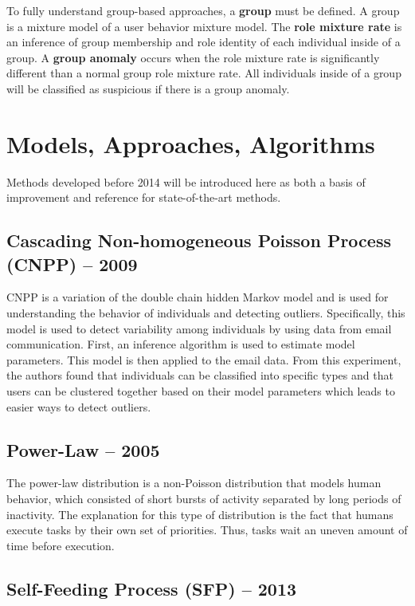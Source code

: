\documentclass[11pt, oneside]{article}   	%
\begin{document}
\quad To fully understand group-based approaches, a \textbf{group} must be defined.
A group is a mixture model of a user behavior mixture model.
The \textbf{role mixture rate} is an inference of group membership and role identity of each individual inside of a group.
A \textbf{group anomaly} occurs when the role mixture rate is significantly different than a normal group role mixture rate.
All individuals inside of a group will be classified as suspicious if there is a group anomaly.

\section*{Models, Approaches, Algorithms}

\quad Methods developed before 2014 will be introduced here as both a basis of improvement and reference for state-of-the-art methods. 

\subsection*{Cascading Non-homogeneous Poisson Process (CNPP) -- 2009}

\quad CNPP is a variation of the double chain hidden Markov model and is used for understanding the behavior of individuals and detecting outliers.
Specifically, this model is used to detect variability among individuals by using data from email communication.
First, an inference algorithm is used to estimate model parameters. 
This model is then applied to the email data.
From this experiment, the authors found that individuals can be classified into specific types and that users can be clustered together based on their model parameters which leads to easier ways to detect outliers.

\subsection*{Power-Law -- 2005}

\quad The power-law distribution is a non-Poisson distribution that models human behavior, which consisted of short bursts of activity separated by long periods of inactivity.
The explanation for this type of distribution is the fact that humans execute tasks by their own set of priorities.
Thus, tasks wait an uneven amount of time before execution.

\subsection*{Self-Feeding Process (SFP) -- 2013}
\end{document}
